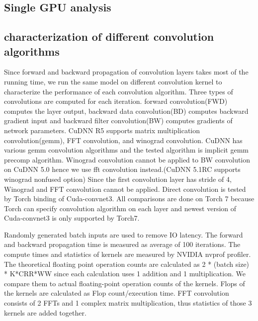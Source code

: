 \documentclass[conference]{IEEEtran}
\begin{document}
\subsection{Single GPU analysis}


\subsection{characterization of different convolution algorithms}
Since forward and backward propagation of convolution layers takes most of the running time, we run the same model on different convolution kernel to characterize the performance of each convolution algorithm.
Three types of convolutions are computed for each iteration.
forward convolution(FWD) computes the layer output, backward data convolution(BD) computes backward gradient input and backward filter convolution(BW) computes gradients of network parameters.
CuDNN R5 supports matrix multiplication convolution(gemm), FFT convolution, and winograd convolution.
CuDNN has various gemm convolution algorithms and the tested algorithm is implicit gemm precomp algorithm.
Winograd convolution cannot be applied to BW convolution on CuDNN 5.0 hence we use fft convolution instead.(CuDNN 5.1RC supports winograd nonfused option)
Since the first convolution layer has stride of 4, Winograd and FFT convolution cannot be applied.
Direct convolution is tested by Torch binding of Cuda-convnet3.
All comparisons are done on Torch 7 because Torch can specify convolution algorithm on each layer and newest version of Cuda-convnet3 is only supported by Torch7.

Randomly generated batch inputs are used to remove IO latency.
The forward and backward propagation time is measured as average of 100 iterations.
The compute times and statistics of kernels are measured by NVIDIA nvprof profiler.
The theoretical floating point operation counts are calculated as 2 * (batch size) * K*CRR*WW since each calculation uses 1 addition and 1 multiplication.
We compare them to actual floating-point operation counts of the kernels.
Flops of the kernels are calculated as Flop count/execution time.
FFT convolution consists of 2 FFTs and 1 complex matrix multiplication, thus statistics of those 3 kernels are added together.
\end{document}
